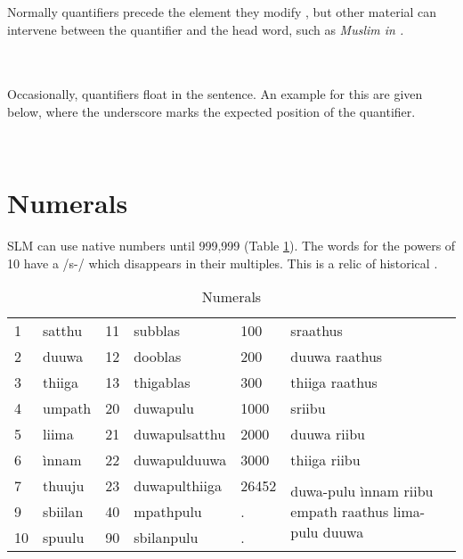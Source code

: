Normally quantifiers precede the element they modify , but other material can intervene between the quantifier and the head word, such as \em Muslim \em in .

\\


 \\
Occasionally, quantifiers float in the sentence.  An example for this are given below, where the underscore marks the expected position of the quantifier.





\\




\section{Numerals}\label{sec:wc:Numerals}
SLM can use native numbers until 999,999 (Table \ref{tab:Numerals}). The words for the powers of 10 have a /s-/ which disappears in their multiples. This is a relic of historical .

\begin{table}
	\centering
		  \begin{tabular}{ll|ll|ll}
  			1 & satthu 	& 11 & subblas   & 100 		& sraathus \\
  			2 & duuwa	& 12 & dooblas   &  200 	& duuwa raathus \\
  			3 & thiiga	& 13 & thigablas &   300 	& thiiga raathus \\
  			4 & umpath	& 20 & duwapulu	 &  1000	& sriibu\\
  			5 & liima	& 21 & duwapulsatthu&  2000	& duuwa riibu \\
  			6 & ìnnam	& 22 & duwapulduuwa &   3000	& thiiga riibu\\
  			7 & thuuju	& 23 & duwapulthiiga & 26452	& \multirow{3}{4cm}{duwa-pulu ìnnam riibu empath raathus lima-pulu duuwa} \\
  			9 & sbiilan	& 40 & mpathpulu	&. \\
  			10 & spuulu	& 90 & sbilanpulu	&. \\
  		\end{tabular}
 			\caption{Numerals}
  		\label{tab:Numerals}
\end{table}




